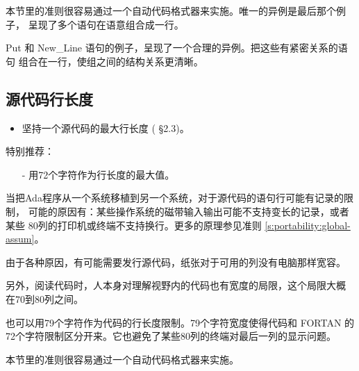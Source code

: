 \begin{blockindent}
本节里的准则很容易通过一个自动代码格式器来实施。唯一的异例是最后那个例子，
呈现了多个语句在语意组合成一行。
\end{blockindent}

\begin{blockindent}
Put 和 New\_Line 语句的例子，呈现了一个合理的异例。把这些有紧密关系的语句
组合在一行，使组之间的结构关系更清晰。
\end{blockindent}

\subsection{源代码行长度}
\begin{itemize}
    \item 坚持一个源代码的最大行长度 (\cite{nissen84} \S{}2.3)。
\end{itemize}

\begin{blockindent}
特别推荐：
\begin{itemize}
    \item[-] 用72个字符作为行长度的最大值。
\end{itemize}
\end{blockindent}

\begin{blockindent}
当把Ada程序从一个系统移植到另一个系统，对于源代码的语句行可能有记录的限制，
可能的原因有：某些操作系统的磁带输入输出可能不支持变长的记录，或者某些
80列的打印机或终端不支持换行。更多的原理参见准则
\ref{s:portability:global-assum}。

由于各种原因，有可能需要发行源代码，纸张对于可用的列没有电脑那样宽容。

另外，阅读代码时，人本身对理解视野内的代码也有宽度的局限，这个局限大概
在70到80列之间。
\end{blockindent}

\begin{blockindent}
也可以用79个字符作为代码的行长度限制。79个字符宽度使得代码和 FORTAN 的
72个字符限制区分开来。它也避免了某些80列的终端对最后一列的显示问题。
\end{blockindent}

\begin{blockindent}
本节里的准则很容易通过一个自动代码格式器来实施。
\end{blockindent}

